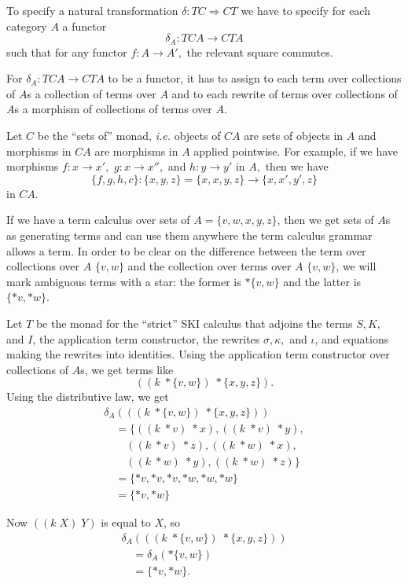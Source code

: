 \documentclass[]{acm_proc_article-sp}
\newcommand{\maps}{\colon}
\numberwithin{equation}{subsection}
\begin{document}
To specify a natural transformation ${\delta: TC \Rightarrow CT}$ we have to specify for each category $A$ a functor \[\delta_A: TCA \to CTA\] such that for any functor $f: A \to A',$ the relevant square commutes.

For ${\delta_A: TCA \to CTA}$ to be a functor, it has to assign to each term over collections of $A$s a collection of terms over $A$ and to each rewrite of terms over collections of $A$s a morphism of collections of terms over $A.$

Let $C$ be the ``sets of'' monad, {\em i.e.} objects of $CA$ are sets of objects in $A$ and morphisms in $CA$ are morphisms in $A$ applied pointwise.  For example, if we have morphisms ${f\maps x\to x',}$ ${g:x\to x'',}$ and ${h:y \to y'}$ in $A,$ then we have
\[\{ f,g,h,c \}:\{ x,y,z \} = \{ x,x,y,z \} \to \{ x, x', y', z \}\]
in $CA.$

If we have a term calculus over sets of $A = \{ v,w,x,y,z \}$, then we get sets of $A$s as generating terms and can use them anywhere the term calculus grammar allows a term.  In order to be clear on the difference between the term over collections over $A$ $\{ v,w \}$ and the collection over terms over $A$ $\{ v,w \}$, we will mark ambiguous terms with a star: the former is $*\{ v,w \}$ and the latter is $\{ *v, *w \}$.

Let $T$ be the monad for the ``strict'' SKI calculus that adjoins the terms $S, K,$ and $I$, the application term constructor, the rewrites $\sigma, \kappa,$ and $\iota$, and equations making the rewrites into identities.  Using the application term constructor over collections of $A$s, we get terms like
   \[ ((k\; *\{ v,w \})\; *\{x,y,z\}). \]
Using the distributive law, we get
  \[\begin{array}{l}
    \delta_A(((k\; *\{ v,w\})\; *\{ x,y,z \})) \\
    \quad   = \{((k\; *v)\; *x), ((k\; *v)\; *y), \\
    \quad\quad ((k\; *v)\; *z), ((k\; *w)\; *x), \\
    \quad\quad ((k\; *w)\; *y), ((k\; *w)\; *z)\} \\
    \quad   = \{*v, *v, *v, *w, *w, *w\} \\
    \quad   = \{*v, *w\}  
  \end{array}\]

Now $((k\; X)\; Y)$ is equal to $X$, so
  \[\begin{array}{l}
    \delta_A(((k\; *\{ v,w \})\; *\{ x,y,z \})) \\
    \quad   = \delta_A(*\{ v,w \})\\
    \quad   = \{ *v, *w \}.
  \end{array}\]
\end{document}
